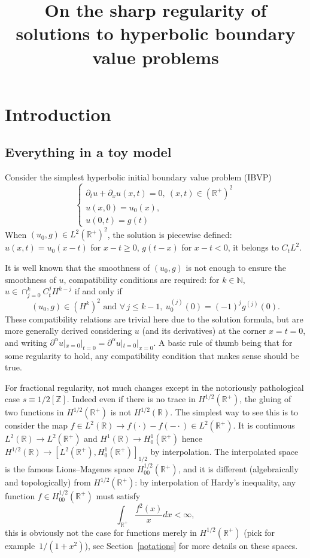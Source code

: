 \documentclass[AHL,Unicode,longabstracts,published]{cedram}
\title[Sharp regularity for hyperbolic BVP]{On the sharp regularity of solutions to hyperbolic boundary value problems}
\author[\initial{C.} \lastname{Audiard}]{\firstname{Corentin} \lastname{Audiard}}
\newcommand{\R}{\mathbb{R}}
\newcommand{\N}{\mathbb{N}}
\newcommand{\Z}{\mathbb{Z}}
\let\oldforall\forall
\renewcommand*{\forall}{\mathrel{\oldforall}}
\newcommand{\N}{\mathbb{N}}
\begin{document}
\maketitle

\section{Introduction}

\subsection{Everything in a toy model}
Consider the simplest hyperbolic initial boundary value problem (IBVP)
\[
\begin{cases}
\partial_tu+\partial_xu(x,t)=0,\ (x,t)\in (\R^+)^2\\
u(x,0)=u_0(x),\\
u(0,t)=g(t)
\end{cases}
\]
When $(u_0,g)\in L^2(\R^+)^2$, the solution is piecewise defined: $u(x,t)=u_0(x-t)$ for $x-t\geq 0$, $g(t-x)$ for $x-t< 0$, it belongs to $C_tL^2$. 


It is well known that the smoothness of $(u_0,g)$ is not enough to ensure the smoothness of $u$, compatibility conditions are required: for $k\in \N$, $u\in \cap_{j=0}^kC_t^jH^{k-j}$ if and only if
\[
(u_0,g)\in \left(H^k\right)^2\text{ and }\forall\,j\leq k-1,\ u_0^{(j)}(0)=(-1)^jg^{(j)}(0).
\]
These compatibility relations are trivial here due to the solution formula, but are more generally derived considering $u$ (and its derivatives) at the corner $x=t=0$, and writing $\partial^\alpha u|_{x=0}|_{t=0}=\partial^\alpha u|_{t=0}|_{x=0}$. A basic rule of thumb being that for some regularity to hold, any compatibility condition that makes sense should be true.

For fractional regularity, not much changes except in the notoriously pathological case $s\equiv 1/2[\Z]$. Indeed even if there is no trace in $H^{1/2}(\R^+)$, the gluing of two functions in $H^{1/2}(\R^+)$ is not $H^{1/2}(\R)$. The simplest way to see this is to consider the map $f\in L^2(\R)\to f(\cdot)-f(-\cdot)\in L^2(\R^+)$. It is continuous $L^2(\R)\to L^2(\R^+)$ and $H^1(\R)\to H^1_0(\R^+)$ hence $H^{1/2}(\R)\to [L^2(\R^+),H^1_0(\R^+)]_{1/2}$ by interpolation. The interpolated space is the famous Lions--Magenes space $H^{1/2}_{00}(\R^+)$, and it is different (algebraically and topologically) from $H^{1/2}(\R^+)$: by interpolation of Hardy's inequality, any function $f\in H^{1/2}_{00}(\R^+)$ must satisfy
\[
\int_{\R^+}\frac{f^2(x)}{x}dx<\infty,
\]
this is obviously not the case for functions merely in $H^{1/2}(\R^+)$ (pick for example~$1/(1+x^2)$), see Section~\ref{notations} for more details on these spaces.
\end{document}
